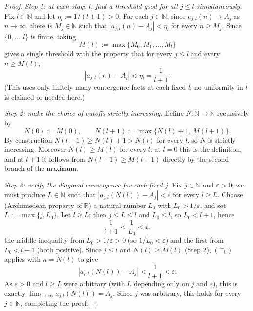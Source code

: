 \begin{proof}
  \emph{Step 1: at each stage $l$, find a threshold good for all $j\le l$ simultaneously.} Fix
  $l\in\mathbb{N}$ and let $\eta_l := 1/(l+1) > 0$. For each $j\in\mathbb{N}$, since $a_{j,l}(n)\to
  A_j$ as $n\to\infty$, there is $M_j\in\mathbb{N}$ such that $|a_{j,l}(n)-A_j| < \eta_l$ for every
  $n\ge M_j$. Since $\{0,\dots,l\}$ is finite, taking
  \[
    M(l) := \max\{M_0,M_1,\dots,M_l\}
  \]
  gives a single threshold with the property that for every $j\le l$ and every $n\ge M(l)$,
  \[
    |a_{j,l}(n) - A_j| < \eta_l = \frac{1}{l+1}
    . \tag{$\ast_l$}
  \]
  (This uses only finitely many convergence facts at each fixed $l$; no uniformity in $l$ is
  claimed or needed here.)

  \emph{Step 2: make the choice of cutoffs strictly increasing.} Define $N\colon\mathbb{N}\to
  \mathbb{N}$ recursively by
  \[
    N(0) := M(0)
    , \qquad
    N(l+1) := \max\{N(l)+1,\ M(l+1)\}
    .
  \]
  By construction $N(l+1) \ge N(l)+1 > N(l)$ for every $l$, so $N$ is strictly increasing.
  Moreover $N(l) \ge M(l)$ for every $l$: at $l=0$ this is the definition, and at $l+1$ it follows
  from $N(l+1)\ge M(l+1)$ directly by the second branch of the maximum.

  \emph{Step 3: verify the diagonal convergence for each fixed $j$.} Fix $j\in\mathbb{N}$ and
  $\varepsilon>0$; we must produce $L\in\mathbb{N}$ such that $|a_{j,l}(N(l))-A_j| < \varepsilon$
  for every $l\ge L$. Choose (Archimedean property of $\mathbb{R}$) a natural number $L_0$ with
  $L_0 > 1/\varepsilon$, and set $L := \max\{j, L_0\}$. Let $l \ge L$; then $j \le L \le l$ and
  $L_0 \le l$, so $L_0 < l+1$, hence
  \[
    \frac{1}{l+1} < \frac{1}{L_0} < \varepsilon
    ,
  \]
  the middle inequality from $L_0 > 1/\varepsilon > 0$ (so $1/L_0 < \varepsilon$) and the first
  from $L_0 < l+1$ (both positive). Since $j \le l$ and $N(l) \ge M(l)$ (Step 2), $(\ast_l)$ applies
  with $n = N(l)$ to give
  \[
    |a_{j,l}(N(l)) - A_j| < \frac{1}{l+1} < \varepsilon
    .
  \]
  As $\varepsilon>0$ and $l\ge L$ were arbitrary (with $L$ depending only on $j$ and $\varepsilon$),
  this is exactly $\lim_{l\to\infty} a_{j,l}(N(l)) = A_j$. Since $j$ was arbitrary, this holds for
  every $j\in\mathbb{N}$, completing the proof.
\end{proof}
